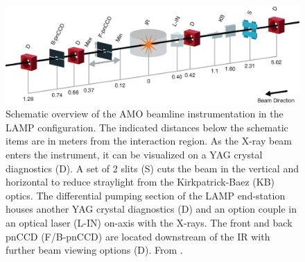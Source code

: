 \begin{figure}
	\centering
		\includegraphics[width=1.00\textwidth]{images/beam_layout.eps}
	\caption[Schematic overview of the AMO beamline instrumentation.]{Schematic overview of the AMO beamline instrumentation in the LAMP configuration. The indicated distances below the schematic items are in meters from the interaction region. As the X-ray beam enters the instrument, it can be visualized on a YAG crystal diagnostics (D). A set of 2 slits (S) cuts the beam in the vertical and horizontal to reduce straylight from the Kirkpatrick-Baez (KB) optics. The differential pumping section of the LAMP end-station houses another YAG crystal diagnostics (D) and an option couple in an optical laser (L-IN) on-axis with the X-rays. The front and back pnCCD (F/B-pnCCD) are located downstream of the IR with further beam viewing options (D). From \citep{Ferguson-2015-JSR}.}
	\label{fig:beam_layout}
\end{figure}
